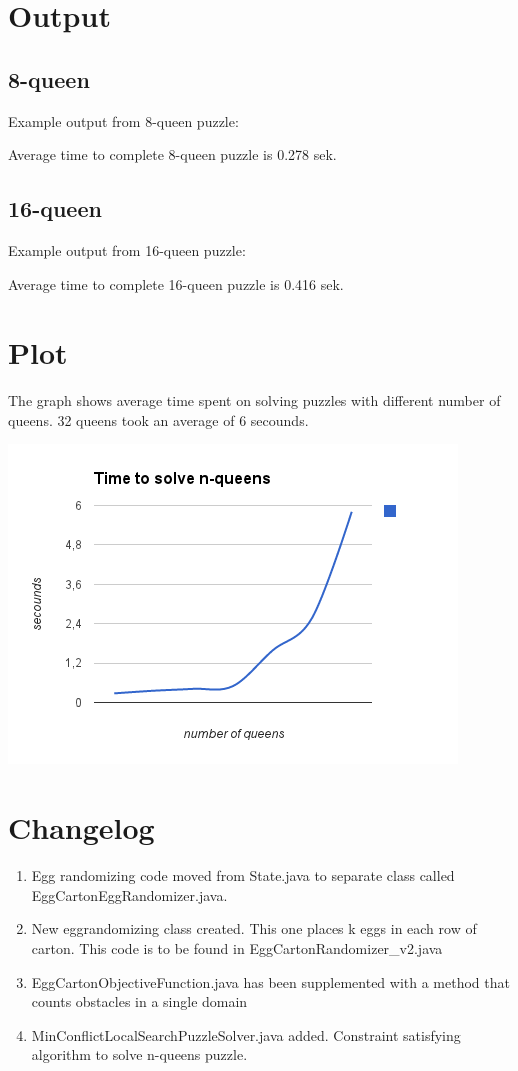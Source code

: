 \documentclass[a4paper]{article}
\begin{document}
\section{Output}
\subsection{8-queen}
Example output from 8-queen puzzle:

Average time to complete 8-queen puzzle is 0.278 sek. 
\subsection{16-queen}
Example output from 16-queen puzzle:

Average time to complete 16-queen puzzle is 0.416 sek.

\section{Plot}
The graph shows average time spent on solving puzzles with different number of queens. 32 queens took an average of 6 secounds.
\\
\centerline{\includegraphics{diagram1.png}}

\section{Changelog}
\begin{enumerate}
	\item Egg randomizing code moved from State.java to separate class called EggCartonEggRandomizer.java.
	\item New eggrandomizing class created. This one places k eggs in each row of carton. This code is to be found in EggCartonRandomizer\_v2.java
	\item EggCartonObjectiveFunction.java has been supplemented with a method that counts obstacles in a single domain
	\item MinConflictLocalSearchPuzzleSolver.java added. Constraint satisfying algorithm to solve n-queens puzzle. 

\end{enumerate}
\end{document}
